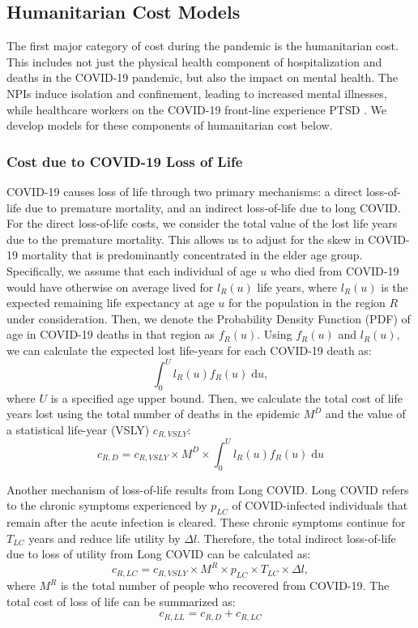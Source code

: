 \documentclass[msom,blindrev]{informs3} %
\renewcommand{\d}{\mathrm{d}}
\begin{document}
\subsection{Humanitarian Cost Models}
\label{subsec:humanitarian_cost}
The first major category of cost during the pandemic is the humanitarian cost. This includes not just the physical health component of hospitalization and deaths in the COVID-19 pandemic, but also the impact on mental health. The NPIs induce isolation and confinement, leading to increased mental illnesses, while healthcare workers on the COVID-19 front-line experience PTSD . We develop models for these components of humanitarian cost below. 


\subsubsection*{Cost due to COVID-19 Loss of Life}

COVID-19 causes loss of life through two primary mechanisms: a direct loss-of-life due to premature mortality, and an indirect loss-of-life due to long COVID. For the direct loss-of-life costs, we consider the total value of the lost life years due to the premature mortality. This allows us to adjust for the skew in COVID-19 mortality that is predominantly concentrated in the elder age group. Specifically, we assume that each individual of age $u$ who died from COVID-19 would have otherwise on average lived for $l_R(u)$ life years, where $l_R(u)$ is the expected remaining life expectancy at age $u$ for the population in the region $R$ under consideration. Then, we denote the Probability Density Function (PDF) of age in COVID-19 deaths in that region as $f_R(u)$. Using $f_R(u)$ and $l_R(u)$, we can calculate the expected lost life-years for each COVID-19 death as:
\begin{equation}
    \int_0^{U} l_R(u)f_R(u) \; \d u,
\end{equation}
where $U$ is a specified age upper bound. Then, we calculate the total cost of life years lost using the total number of deaths in the epidemic $M^D$ and the value of a statistical life-year (VSLY) $c_{R,VSLY}$:
\begin{equation}
    c_{R,D}= c_{R,VSLY} \times M^D \times  \int_0^{U} l_R(u)f_R(u) \; \d u
\end{equation}

Another mechanism of loss-of-life results from Long COVID. Long COVID refers to the chronic symptoms experienced by $p_{LC}$ of COVID-infected individuals that remain after the acute infection is cleared. These chronic symptoms continue for $T_{LC}$ years and reduce life utility by $\Delta l$. Therefore, the total indirect loss-of-life due to loss of utility from Long COVID can be calculated as:
\[c_{R,LC} = c_{R,VSLY} \times M^R \times p_{LC} \times T_{LC} \times \Delta l,\]
where $M^R$ is the total number of people who recovered from COVID-19. The total cost of loss of life can be summarized as:
\[c_{R,LL} = c_{R,D} + c_{R,LC}\]
\end{document}
